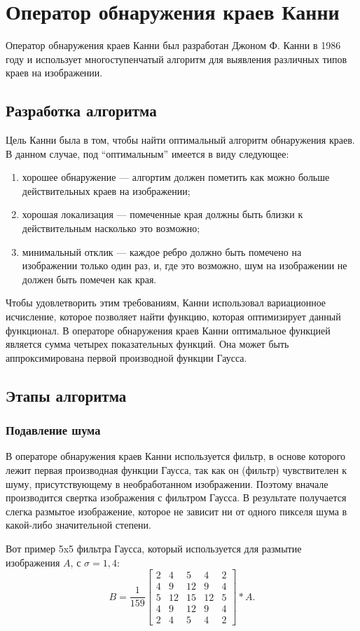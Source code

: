 \section{Оператор обнаружения краев Канни}
Оператор обнаружения краев Канни был разработан Джоном Ф. Канни в 1986 году и использует многоступенчатый алгоритм для выявления различных типов краев на изображении.

\subsection{Разработка алгоритма}
Цель Канни была в том, чтобы найти оптимальный алгоритм обнаружения краев. В данном случае, под ``оптимальным'' имеется в виду следующее:
\begin{enumerate}
  \item хорошее обнаружение --- алгортим должен пометить как можно больше действительных краев на изображении;
  \item хорошая локализация --- помеченные края должны быть близки к действительным насколько это возможно;
  \item минимальный отклик --- каждое ребро должно быть помечено на изображении только один раз, и, где это возможно, шум на изображении не должен быть помечен как края.
\end{enumerate}

Чтобы удовлетворить этим требованиям, Канни использовал вариационное исчисление, которое позволяет найти функцию, которая оптимизирует данный функционал. В операторе обнаружения краев Канни оптимальное функцией является сумма четырех показательных функций. Она может быть аппроксимирована первой производной функции Гаусса.

\subsection{Этапы алгоритма}
\subsubsection{Подавление шума}
В операторе обнаружения краев Канни используется фильтр, в основе которого лежит первая производная функции Гаусса, так как он (фильтр) чувствителен к шуму, присутствующему в необработанном изображении. Поэтому вначале производится свертка изображения с фильтром Гаусса. В результате получается слегка размытое изображение, которое не зависит ни от одного пикселя шума в какой-либо значительной степени.

Вот пример 5x5 фильтра Гаусса, который используется для размытие изображения $A$, с $\sigma = 1,4$:
\begin{displaymath}
  B = \frac{1}{159}
  \begin{bmatrix}
    2 &  4 &  5 &  4 & 2 \\
    4 &  9 & 12 &  9 & 4 \\
    5 & 12 & 15 & 12 & 5 \\
    4 &  9 & 12 &  9 & 4 \\
    2 &  4 &  5 &  4 & 2
  \end{bmatrix} * A.
\end{displaymath}

